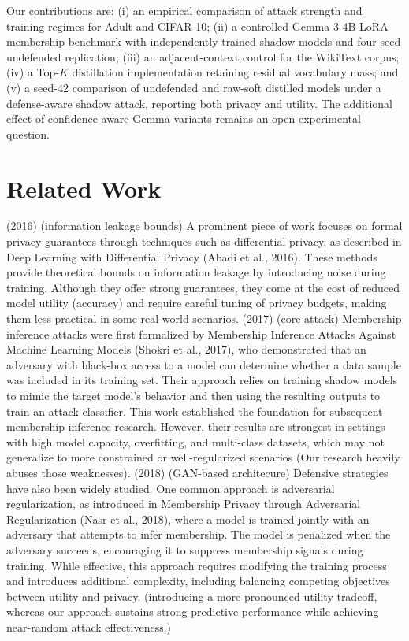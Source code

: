 \documentclass[conference]{IEEEtran}
\begin{document}
Our contributions are: (i) an empirical comparison of attack strength and training regimes for Adult and CIFAR-10; (ii) a controlled Gemma 3 4B LoRA membership benchmark with independently trained shadow models and four-seed undefended replication; (iii) an adjacent-context control for the WikiText corpus; (iv) a Top-$K$ distillation implementation retaining residual vocabulary mass; and (v) a seed-42 comparison of undefended and raw-soft distilled models under a defense-aware shadow attack, reporting both privacy and utility. The additional effect of confidence-aware Gemma variants remains an open experimental question.

\section{Related Work}
(2016) (information leakage bounds)
A prominent piece of work focuses on formal privacy guarantees through techniques such as differential privacy, as described in Deep Learning with Differential Privacy (Abadi et al., 2016). These methods provide theoretical bounds on information leakage by introducing noise during training. Although they offer strong guarantees, they come at the cost of reduced model utility (accuracy) and require careful tuning of privacy budgets, making them less practical in some real-world scenarios.
(2017) (core attack)
Membership inference attacks were first formalized by Membership Inference Attacks Against Machine Learning Models (Shokri et al., 2017), who demonstrated that an adversary with black-box access to a model can determine whether a data sample was included in its training set. Their approach relies on training shadow models to mimic the target model’s behavior and then using the resulting outputs to train an attack classifier. This work established the foundation for subsequent membership inference research. However, their results are strongest in settings with high model capacity, overfitting, and multi-class datasets, which may not generalize to more constrained or well-regularized scenarios (Our research heavily abuses those weaknesses).
(2018) (GAN-based architecure)
Defensive strategies have also been widely studied. One common approach is adversarial regularization, as introduced in Membership Privacy through Adversarial Regularization (Nasr et al., 2018), where a model is trained jointly with an adversary that attempts to infer membership. The model is penalized when the adversary succeeds, encouraging it to suppress membership signals during training. While effective, this approach requires modifying the training process and introduces additional complexity, including balancing competing objectives between utility and privacy. (introducing a more pronounced utility tradeoff, whereas our approach sustains strong predictive performance while achieving near-random attack effectiveness.)
\end{document}
